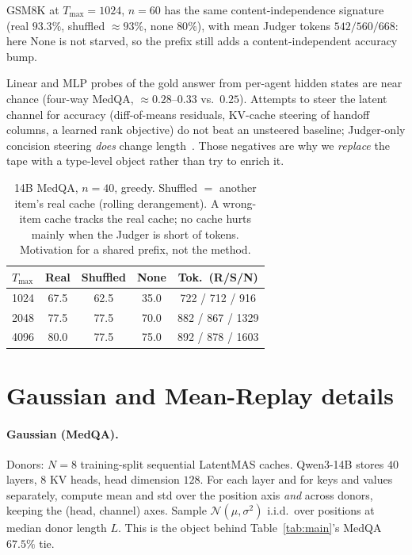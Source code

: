 \documentclass[11pt]{article}
\begin{document}
GSM8K at $T_{\max}{=}1024$, $n{=}60$ has the same content-independence
signature (real $93.3\%$, shuffled ${\approx}93\%$, none $80\%$), with
mean Judger tokens $542 / 560 / 668$: here None is not starved, so the
prefix still adds a content-independent accuracy bump.

Linear and MLP probes of the gold answer from per-agent hidden states
are near chance (four-way MedQA, ${\approx}0.28$--$0.33$ vs.\ $0.25$).
Attempts to steer the latent channel for accuracy (diff-of-means
residuals, KV-cache steering of handoff columns, a learned rank
objective) do not beat an unsteered baseline; Judger-only concision
steering \emph{does} change length~\citep{chen2025seal,li2025kvsteer}.
Those negatives are why we \emph{replace} the tape with a type-level
object rather than try to enrich it.

\begin{table}[h]
\centering
\small
\setlength{\tabcolsep}{3.5pt}
\begin{tabular}{lcccc}
\toprule
$T_{\max}$ & Real & Shuffled & None & Tok.\ (R/S/N) \\
\midrule
1024 & 67.5 & 62.5 & 35.0 & 722 / 712 / 916 \\
2048 & 77.5 & 77.5 & 70.0 & 882 / 867 / 1329 \\
4096 & 80.0 & 77.5 & 75.0 & 892 / 878 / 1603 \\
\bottomrule
\end{tabular}
\caption{14B MedQA, $n{=}40$, greedy.
Shuffled $=$ another item's real cache (rolling derangement).
A wrong-item cache tracks the real cache; no cache hurts mainly when
the Judger is short of tokens.
Motivation for a shared prefix, not the method.}
\label{tab:swap}
\end{table}

\section{Gaussian and Mean-Replay details}
\label{app:synth}
\paragraph{Gaussian (MedQA).}
Donors: $N{=}8$ training-split sequential LatentMAS caches.
Qwen3-14B stores $40$ layers, $8$ KV heads, head dimension $128$.
For each layer and for keys and values separately, compute mean and
std over the position axis \emph{and} across donors, keeping the
(head, channel) axes.
Sample $\mathcal{N}(\mu,\sigma^{2})$ i.i.d.\ over positions at median
donor length $L$.
This is the object behind Table~\ref{tab:main}'s MedQA $67.5\%$ tie.
\end{document}

